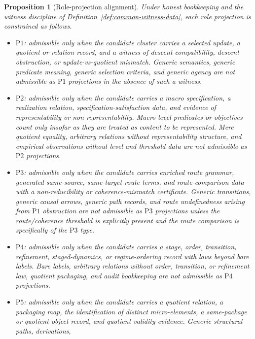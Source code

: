 \documentclass[11pt]{article}
\newtheorem{proposition}[theorem]{Proposition}
\theoremstyle{definition}
\newcommand{\Pone}{\ensuremath{\mathrm{P1}}}
\newcommand{\Ptwo}{\ensuremath{\mathrm{P2}}}
\newcommand{\Pthree}{\ensuremath{\mathrm{P3}}}
\newcommand{\Pfour}{\ensuremath{\mathrm{P4}}}
\newcommand{\Pfive}{\ensuremath{\mathrm{P5}}}
\begin{document}
\begin{proposition}[Role-projection alignment]\label{prop:alignment-rules}
Under honest bookkeeping and the witness discipline of
Definition~\ref{def:common-witness-data}, each role projection is
constrained as follows.
\begin{itemize}[topsep=2pt,itemsep=1pt]
  \item \Pone{}: admissible only when the candidate cluster carries a
    selected update, a quotient or relation record, and a witness of
    descent compatibility, descent obstruction, or update-vs-quotient
    mismatch. Generic semantics, generic predicate meaning, generic
    selection criteria, and generic agency are not admissible as
    \Pone{} projections in the absence of such a witness.
  \item \Ptwo{}: admissible only when the candidate carries a macro
    specification, a realization relation, specification-satisfaction
    data, and evidence of representability or non-representability.
    Macro-level predicates or objectives count only insofar as they are
    treated as content to be represented. Mere quotient equality,
    arbitrary relations without representability structure, and
    empirical observations without level and threshold data are not
    admissible as \Ptwo{} projections.
  \item \Pthree{}: admissible only when the candidate carries enriched
    route grammar, generated same-source, same-target route terms, and
    route-comparison data with a non-reducibility or coherence-mismatch
    certificate. Generic transitions, generic causal arrows, generic
    path records, and route undefinedness arising from \Pone{}
    obstruction are not admissible as \Pthree{} projections unless the
    route/coherence threshold is explicitly present and the route
    comparison is specifically of the \Pthree{} type.
  \item \Pfour{}: admissible only when the candidate carries a stage,
    order, transition, refinement, staged-dynamics, or regime-ordering
    record with laws beyond bare labels. Bare labels, arbitrary
    relations without order, transition, or refinement law, quotient
    packaging, and audit bookkeeping are not admissible as \Pfour{}
    projections.
  \item \Pfive{}: admissible only when the candidate carries a quotient
    relation, a packaging map, the identification of distinct
    micro-elements, a same-package or quotient-object record, and
    quotient-validity evidence. Generic structural paths, derivations,

\end{itemize}
\end{proposition}
\end{document}
